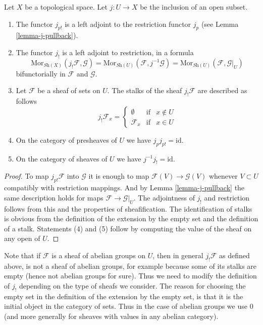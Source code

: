 \begin{lemma}
\label{lemma-j-shriek}
Let $X$ be a topological space.
Let $j : U \to X$ be the inclusion of an open subset.
\begin{enumerate}
\item The functor $j_{p!}$ is a left adjoint to the
restriction functor $j_p$ (see Lemma \ref{lemma-j-pullback}).
\item The functor $j_!$ is a left adjoint to restriction,
in a formula
$$
\text{Mor}_{\textit{Sh}(X)}(j_!\mathcal{F}, \mathcal{G})
=
\text{Mor}_{\textit{Sh}(U)}(\mathcal{F}, j^{-1}\mathcal{G})
=
\text{Mor}_{\textit{Sh}(U)}(\mathcal{F}, \mathcal{G}|_U)
$$
bifunctorially in $\mathcal{F}$ and $\mathcal{G}$.
\item Let $\mathcal{F}$ be a sheaf of sets on $U$.
The stalks of the sheaf $j_!\mathcal{F}$ are described
as follows
$$
j_{!}\mathcal{F}_x =
\left\{
\begin{matrix}
\emptyset & \text{if} & x \not \in U \\
\mathcal{F}_x & \text{if} & x \in U 
\end{matrix}
\right.
$$
\item On the category of presheaves of $U$ we have $j_pj_{p!} = \text{id}$.
\item On the category of sheaves of $U$ we have $j^{-1}j_! = \text{id}$.
\end{enumerate}
\end{lemma}

\begin{proof}
To map $j_{p!}\mathcal{F}$ into $\mathcal{G}$
it is enough to map $\mathcal{F}(V) \to \mathcal{G}(V)$
whenever $V \subset U$ compatibly with restriction
mappings. And by Lemma \ref{lemma-j-pullback}
the same description holds for maps
$\mathcal{F} \to \mathcal{G}|_U$.
The adjointness of $j_!$ and restriction follows
from this and the properties of sheafification.
The identification of stalks is obvious from the
definition of the extension by the empty set
and the definition of a stalk.
Statements (4) and (5) follow by computing the
value of the sheaf on any open of $U$.
\end{proof}

\noindent
Note that if $\mathcal{F}$ is a sheaf
of abelian groups on $U$, then in general $j_!\mathcal{F}$ as
defined above, is not a sheaf of abelian groups, for example
because some of its stalks are empty (hence not abelian groups
for sure). Thus we need to modify the definition of
$j_!$ depending on the type of sheafs we consider.
The reason for choosing the empty set in the definition of the
extension by the empty set, is that it is the initial object 
in the category of sets. Thus in the case of abelian groups
we use $0$ (and more generally for sheaves with values in
any abelian category).

